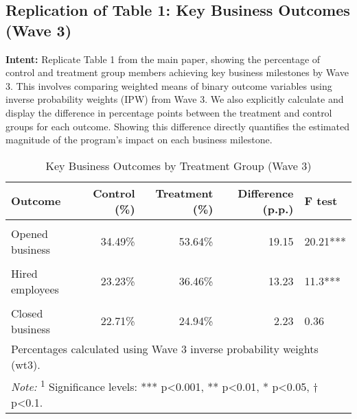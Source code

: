 \documentclass[
]{article}
\begin{document}
\subsection{Replication of Table 1: Key Business Outcomes (Wave
3)}\label{replication-of-table-1-key-business-outcomes-wave-3}

\textbf{Intent:} Replicate Table 1 from the main paper, showing the
percentage of control and treatment group members achieving key business
milestones by Wave 3. This involves comparing weighted means of binary
outcome variables using inverse probability weights (IPW) from Wave 3.
We also explicitly calculate and display the difference in percentage
points between the treatment and control groups for each outcome.
Showing this difference directly quantifies the estimated magnitude of
the program's impact on each business milestone.

\begin{table}
\centering
\caption{\label{tab:table1-replication}Key Business Outcomes by Treatment Group (Wave 3)}
\centering
\begin{tabular}[t]{lrrrl}
\toprule
Outcome & Control (\%) & Treatment (\%) & Difference (p.p.) & F test\\
\midrule
\cellcolor{gray!10}{Selected location} & \cellcolor{gray!10}{56.58\%} & \cellcolor{gray!10}{67.11\%} & \cellcolor{gray!10}{10.54} & \cellcolor{gray!10}{6.28*}\\
Opened business & 34.49\% & 53.64\% & 19.15 & 20.21***\\
\cellcolor{gray!10}{Made purchases} & \cellcolor{gray!10}{30.85\%} & \cellcolor{gray!10}{58.49\%} & \cellcolor{gray!10}{27.64} & \cellcolor{gray!10}{44.32***}\\
Hired employees & 23.23\% & 36.46\% & 13.23 & 11.3***\\
\cellcolor{gray!10}{Made profit} & \cellcolor{gray!10}{40.91\%} & \cellcolor{gray!10}{60.72\%} & \cellcolor{gray!10}{19.81} & \cellcolor{gray!10}{21.53***}\\
\addlinespace
Closed business & 22.71\% & 24.94\% & 2.23 & 0.36\\
\bottomrule
\multicolumn{5}{l}{\rule{0pt}{1em}Percentages calculated using Wave 3 inverse probability weights (wt3).}\\
\multicolumn{5}{l}{\rule{0pt}{1em}\textit{Note: } \textsuperscript{1} Significance levels: *** p<0.001, ** p<0.01, * p<0.05, † p<0.1.}\\
\end{tabular}
\end{table}
\end{document}
